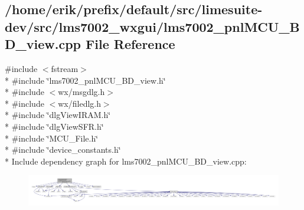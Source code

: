 \subsection{/home/erik/prefix/default/src/limesuite-\/dev/src/lms7002\+\_\+wxgui/lms7002\+\_\+pnl\+M\+C\+U\+\_\+\+B\+D\+\_\+view.cpp File Reference}
\label{lms7002__pnlMCU__BD__view_8cpp}
{\ttfamily \#include $<$fstream$>$}\\*
{\ttfamily \#include \char`\"{}lms7002\+\_\+pnl\+M\+C\+U\+\_\+\+B\+D\+\_\+view.\+h\char`\"{}}\\*
{\ttfamily \#include $<$wx/msgdlg.\+h$>$}\\*
{\ttfamily \#include $<$wx/filedlg.\+h$>$}\\*
{\ttfamily \#include \char`\"{}dlg\+View\+I\+R\+A\+M.\+h\char`\"{}}\\*
{\ttfamily \#include \char`\"{}dlg\+View\+S\+F\+R.\+h\char`\"{}}\\*
{\ttfamily \#include \char`\"{}M\+C\+U\+\_\+\+File.\+h\char`\"{}}\\*
{\ttfamily \#include \char`\"{}device\+\_\+constants.\+h\char`\"{}}\\*
Include dependency graph for lms7002\+\_\+pnl\+M\+C\+U\+\_\+\+B\+D\+\_\+view.\+cpp\+:
\nopagebreak
\begin{figure}[H]
\begin{center}
\leavevmode
\includegraphics[width=350pt]{d5/db4/lms7002__pnlMCU__BD__view_8cpp__incl}
\end{center}
\end{figure}
